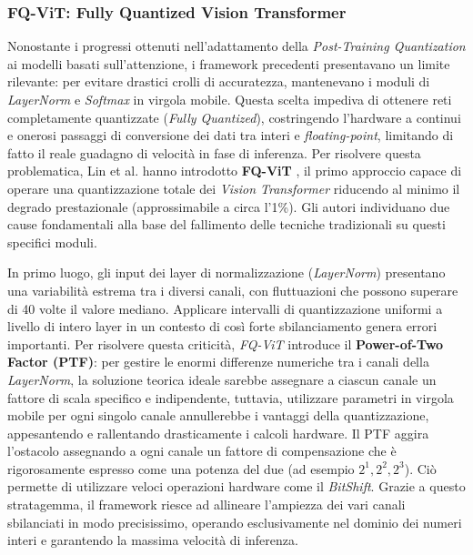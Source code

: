 \subsubsection{FQ-ViT: Fully Quantized Vision Transformer}
Nonostante i progressi ottenuti nell'adattamento della \textit{Post-Training
    Quantization} ai modelli basati sull'attenzione, i framework precedenti
presentavano un limite rilevante: per evitare drastici crolli di accuratezza,
mantenevano i moduli di \textit{LayerNorm} e \textit{Softmax} in virgola
mobile. Questa scelta impediva di ottenere reti completamente quantizzate
(\textit{Fully Quantized}), costringendo l'hardware a continui e onerosi
passaggi di conversione dei dati tra interi e \textit{floating-point},
limitando di fatto il reale guadagno di velocità in fase di inferenza. Per
risolvere questa problematica, Lin et al. hanno introdotto \textbf{FQ-ViT}
\cite{lin2023fqvitposttrainingquantizationfully}, il primo approccio capace di
operare una quantizzazione totale dei \textit{Vision Transformer} riducendo al
minimo il degrado prestazionale (approssimabile a circa l'1\%). Gli autori
individuano due cause fondamentali alla base del fallimento delle tecniche
tradizionali su questi specifici moduli. \par
In primo luogo, gli input dei layer di normalizzazione (\textit{LayerNorm})
presentano una variabilità estrema tra i diversi canali, con fluttuazioni che
possono superare di 40 volte il valore mediano. Applicare intervalli di
quantizzazione uniformi a livello di intero layer in un contesto di così forte
sbilanciamento genera errori importanti. Per risolvere questa criticità,
\textit{FQ-ViT} introduce il \textbf{Power-of-Two Factor (PTF)}: per gestire le
enormi differenze numeriche tra i canali della \textit{LayerNorm}, la soluzione
teorica ideale sarebbe assegnare a ciascun canale un fattore di scala specifico
e indipendente, tuttavia, utilizzare parametri in virgola mobile per ogni
singolo canale annullerebbe i vantaggi della quantizzazione, appesantendo e
rallentando drasticamente i calcoli hardware. Il PTF aggira l'ostacolo
assegnando a ogni canale un fattore di compensazione che è rigorosamente
espresso come una potenza del due (ad esempio $2^1, 2^2, 2^3$). Ciò permette di
utilizzare veloci operazioni hardware come il \textit{BitShift}. Grazie a
questo stratagemma, il framework riesce ad allineare l'ampiezza dei vari canali
sbilanciati in modo precisissimo, operando esclusivamente nel dominio dei
numeri interi e garantendo la massima velocità di inferenza. \par
